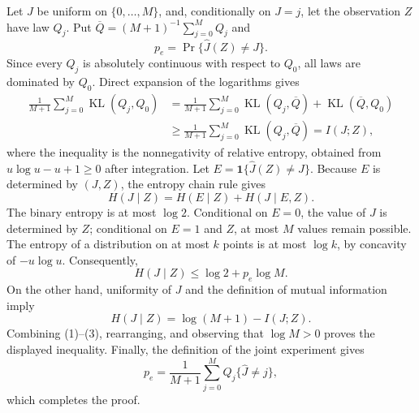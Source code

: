 Let \(J\) be uniform on \(\{0,\ldots,M\}\), and, conditionally on \(J=j\), let the observation \(Z\) have law \(Q_j\). Put \(\overline Q=(M+1)^{-1}\sum_{j=0}^M Q_j\) and
\[
 p_e=\Pr\{\widehat J(Z)\ne J\}.
\]
Since every \(Q_j\) is absolutely continuous with respect to \(Q_0\), all laws are dominated by \(Q_0\). Direct expansion of the logarithms gives
\[
 \begin{aligned}
 \frac1{M+1}\sum_{j=0}^M\operatorname{KL}(Q_j,Q_0)
 &=\frac1{M+1}\sum_{j=0}^M\operatorname{KL}(Q_j,\overline Q)
   +\operatorname{KL}(\overline Q,Q_0)\\
 &\ge \frac1{M+1}\sum_{j=0}^M\operatorname{KL}(Q_j,\overline Q)
 =I(J;Z),
 \end{aligned} \tag{1}
\]
where the inequality is the nonnegativity of relative entropy, obtained from \(u\log u-u+1\ge0\) after integration. Let \(E=\mathbf 1\{\widehat J(Z)\ne J\}\). Because \(E\) is determined by \((J,Z)\), the entropy chain rule gives
\[
 H(J\mid Z)=H(E\mid Z)+H(J\mid E,Z).
\]
The binary entropy is at most \(\log2\). Conditional on \(E=0\), the value of \(J\) is determined by \(Z\); conditional on \(E=1\) and \(Z\), at most \(M\) values remain possible. The entropy of a distribution on at most \(k\) points is at most \(\log k\), by concavity of \(-u\log u\). Consequently,
\[
 H(J\mid Z)\le\log2+p_e\log M. \tag{2}
\]
On the other hand, uniformity of \(J\) and the definition of mutual information imply
\[
 H(J\mid Z)=\log(M+1)-I(J;Z). \tag{3}
\]
Combining (1)--(3), rearranging, and observing that \(\log M>0\) proves the displayed inequality. Finally, the definition of the joint experiment gives
\[
 p_e=\frac1{M+1}\sum_{j=0}^M Q_j\{\widehat J\ne j\},
\]
which completes the proof.